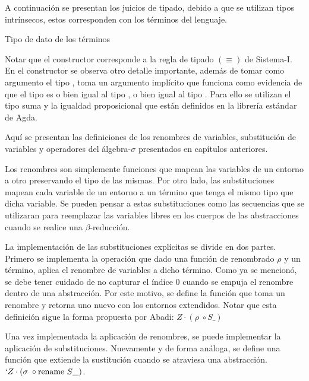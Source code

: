 \documentclass[]{report}
\begin{document}
	
	A continuación se presentan los juicios de tipado, debido a que se utilizan tipos intrínsecos, estos corresponden con los términos del lenguaje.
	
	\begin{codigo}
		Tipo de dato de los términos
		
	\end{codigo}
	
	Notar que el constructor \AgdaInductiveConstructor{$[\_]\equiv\_$} corresponde a la regla de tipado $(\equiv)$ de Sistema-I.
	En el constructor \AgdaInductiveConstructor{$\pi$} se observa otro detalle importante, además de tomar como argumento el tipo , toma un argumento implícito que funciona como evidencia de que el tipo  es o bien igual al tipo , o bien igual al tipo . Para ello se utilizan el tipo suma y la igualdad proposicional que están definidos en la librería estándar de Agda.
	
	
	Aquí se presentan las definiciones de los renombres de variables, substitución de variables y operadores del álgebra-$\sigma$ presentados en capítulos anteriores.
	
	
	Los renombres son simplemente funciones que mapean las variables de un entorno a otro preservando el tipo de las mismas.
	Por otro lado, las substituciones mapean cada variable de un entorno a un término que tenga el mismo tipo que dicha variable.
	Se pueden pensar a estas substituciones como las secuencias que se utilizaran para reemplazar las variables libres en los cuerpos de las abstracciones cuando se realice una $\beta$-reducción. 
	
	La implementación de las substituciones explícitas se divide en dos partes.
	Primero se implementa la operación  que dado una función de renombrado $\rho$ y un término, aplica el renombre de variables a dicho término.
	Como ya se mencionó, se debe tener cuidado de no capturar el índice 0 cuando se empuja el renombre dentro de una abstracción.
	Por este motivo, se define la función  que toma un renombre y retorna uno nuevo con los entornos extendidos.
	Notar que esta definición sigue la forma propuesta por Abadi: $Z \cdot (\rho \; \circ S\_)$
	
	
	Una vez implementada la aplicación de renombres, se puede implementar la aplicación de substituciones.
	Nuevamente y de forma análoga, se define una función  que extiende la sustitución cuando se atraviesa una abstracción. $`Z \cdot (\sigma \; \circ \text{rename } S\_)$.
	
\end{document}
